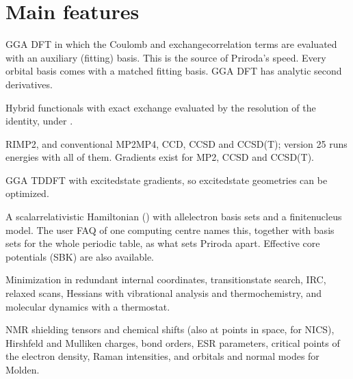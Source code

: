 \documentclass[letterpaper,10pt,english,openany,oneside]{sphinxmanual}
\begin{document}
\section{Main features}
\label{\detokenize{start/about:main-features}}\begin{description}
\sphinxAtStartPar
GGA DFT in which the Coulomb and exchange\textendash{}correlation terms are evaluated with an auxiliary (fitting) basis.
This is the source of Priroda’s speed. Every orbital basis comes with a matched fitting basis.
GGA DFT has analytic second derivatives.




\sphinxAtStartPar
Hybrid functionals with exact exchange evaluated by the resolution of the identity, under
{\hyperref[\detokenize{reference/control:control-theory}]{}}.



\sphinxAtStartPar
RI\sphinxhyphen{}MP2, and conventional MP2\textendash{}MP4, CCD, CCSD and CCSD(T); version 25 runs energies with all of them. Gradients
exist for MP2, CCSD and CCSD(T).



\sphinxAtStartPar
GGA TDDFT with excited\sphinxhyphen{}state gradients, so excited\sphinxhyphen{}state geometries can be optimized.



\sphinxAtStartPar
A scalar\sphinxhyphen{}relativistic Hamiltonian ({\hyperref[\detokenize{reference/control:control-four}]{}}) with all\sphinxhyphen{}electron basis sets and a finite\sphinxhyphen{}nucleus
model. The user FAQ of one computing centre names this, together with basis sets for the whole periodic table, as
what sets Priroda apart. Effective core potentials (SBK) are also available.



\sphinxAtStartPar
Minimization in redundant internal coordinates, transition\sphinxhyphen{}state search, IRC, relaxed scans, Hessians with
vibrational analysis and thermochemistry, and molecular dynamics with a thermostat.



\sphinxAtStartPar
NMR shielding tensors and chemical shifts (also at points in space, for NICS), Hirshfeld and Mulliken charges, bond
orders, ESR parameters, critical points of the electron density, Raman intensities, and orbitals and normal modes
for Molden.




\end{description}
\end{document}
